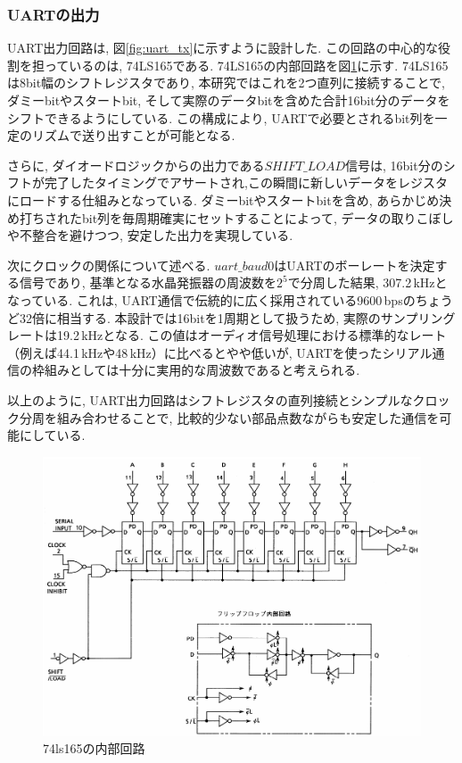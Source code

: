 \documentclass[a4paper,10pt]{article}
\begin{document}
\begin{multicols}{2}[\raggedcolumns]
\subsubsection{UARTの出力}
UART出力回路は, 図\ref{fig:uart_tx}に示すように設計した.  
この回路の中心的な役割を担っているのは, 74LS165である.
74LS165の内部回路を図\ref{fig:74165}に示す.
74LS165は8bit幅のシフトレジスタであり, 本研究ではこれを2つ直列に接続することで, ダミーbitやスタートbit, そして実際のデータbitを含めた合計16bit分のデータをシフトできるようにしている.  
この構成により, UARTで必要とされるbit列を一定のリズムで送り出すことが可能となる.  

さらに, ダイオードロジックからの出力である$SHIFT\_LOAD$信号は, 16bit分のシフトが完了したタイミングでアサートされ,この瞬間に新しいデータをレジスタにロードする仕組みとなっている.  
ダミーbitやスタートbitを含め, あらかじめ決め打ちされたbit列を毎周期確実にセットすることによって, データの取りこぼしや不整合を避けつつ, 安定した出力を実現している.  

次にクロックの関係について述べる.  
$uart\_baud0$はUARTのボーレートを決定する信号であり, 基準となる水晶発振器の周波数を$2^5$で分周した結果, 307.2\,kHzとなっている.  
これは, UART通信で伝統的に広く採用されている9600\,bpsのちょうど32倍に相当する.  
本設計では16bitを1周期として扱うため, 実際のサンプリングレートは19.2\,kHzとなる.  
この値はオーディオ信号処理における標準的なレート（例えば44.1\,kHzや48\,kHz）に比べるとやや低いが, UARTを使ったシリアル通信の枠組みとしては十分に実用的な周波数であると考えられる.  

以上のように, UART出力回路はシフトレジスタの直列接続とシンプルなクロック分周を組み合わせることで, 比較的少ない部品点数ながらも安定した通信を可能にしている.  

\begin{figure}[H]
    \centering
    \includegraphics[width=0.8\linewidth]{figure/74165.png} 
    \caption{74ls165の内部回路} 
    \label{fig:74165}
\end{figure}


\end{multicols}
\end{document}
